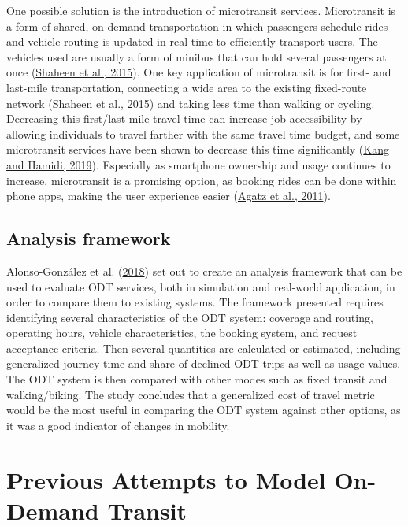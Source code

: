 \documentclass[
]{report}
\begin{document}
One possible solution is the introduction of microtransit services. Microtransit is a form of shared, on-demand transportation in which passengers schedule rides and vehicle routing is updated in real time to efficiently transport users. The vehicles used are usually a form of minibus that can hold several passengers at once (\protect\hyperlink{ref-Shaheen2015}{Shaheen et al., 2015}). One key application of microtransit is for first- and last-mile transportation, connecting a wide area to the existing fixed-route network (\protect\hyperlink{ref-Shaheen2015}{Shaheen et al., 2015}) and taking less time than walking or cycling. Decreasing this first/last mile travel time can increase job accessibility by allowing individuals to travel farther with the same travel time budget, and some microtransit services have been shown to decrease this time significantly (\protect\hyperlink{ref-Kang2019}{Kang and Hamidi, 2019}). Especially as smartphone ownership and usage continues to increase, microtransit is a promising option, as booking rides can be done within phone apps, making the user experience easier (\protect\hyperlink{ref-Agatz2011}{Agatz et al., 2011}).

\hypertarget{analysis-framework}{%
\subsection{Analysis framework}\label{analysis-framework}}

Alonso-González et al. (\protect\hyperlink{ref-Alonso-Gonzalez2018}{2018}) set out to create an analysis framework that can be used to evaluate ODT services, both in simulation and real-world application, in order to compare them to existing systems. The framework presented requires identifying several characteristics of the ODT system: coverage and routing, operating hours, vehicle characteristics, the booking system, and request acceptance criteria. Then several quantities are calculated or estimated, including generalized journey time and share of declined ODT trips as well as usage values. The ODT system is then compared with other modes such as fixed transit and walking/biking. The study concludes that a generalized cost of travel metric would be the most useful in comparing the ODT system against other options, as it was a good indicator of changes in mobility.

\hypertarget{previous-attempts-to-model-on-demand-transit}{%
\section{Previous Attempts to Model On-Demand Transit}\label{previous-attempts-to-model-on-demand-transit}}
\end{document}
